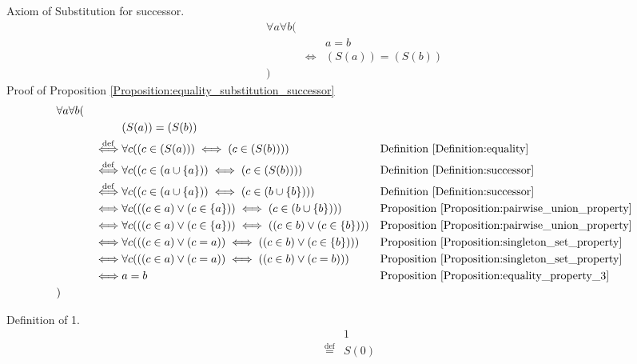 \begin{prop}
\label{Proposition:equality_substitution_successor}
Axiom of Substitution for successor.
\begin{align*}
& \forall a \forall b ( \\
& & & a = b \\
& & \iff & (S(a)) = (S(b)) \\
& )
\end{align*}
Proof of Proposition \ref{Proposition:equality_substitution_successor}
\begin{align*}
& \forall a \forall b ( \\
& & & (S(a)) = (S(b)) \\
& & \overset{\operatorname{def}}{\iff} & \forall c ((c \in (S(a))) \iff (c \in (S(b))))
& & \text{Definition \ref{Definition:equality}} \\
& & \overset{\operatorname{def}}{\iff} & \forall c ((c \in (a \cup \{ a \})) \iff (c \in (S(b))))
& & \text{Definition \ref{Definition:successor}} \\
& & \overset{\operatorname{def}}{\iff} & \forall c ((c \in (a \cup \{ a \})) \iff (c \in (b \cup \{ b \})))
& & \text{Definition \ref{Definition:successor}} \\
& & \iff & \forall c (((c \in a) \lor (c \in \{ a \})) \iff (c \in (b \cup \{ b \})))
& & \text{Proposition \ref{Proposition:pairwise_union_property}} \\
& & \iff & \forall c (((c \in a) \lor (c \in \{ a \})) \iff ((c \in b) \lor (c \in \{ b \})))
& & \text{Proposition \ref{Proposition:pairwise_union_property}} \\
& & \iff & \forall c (((c \in a) \lor (c = a)) \iff ((c \in b) \lor (c \in \{ b \})))
& & \text{Proposition \ref{Proposition:singleton_set_property}} \\
& & \iff & \forall c (((c \in a) \lor (c = a)) \iff ((c \in b) \lor (c = b)))
& & \text{Proposition \ref{Proposition:singleton_set_property}} \\
& & \iff & a = b
& & \text{Proposition \ref{Proposition:equality_property_3}} \\
& )
\end{align*}
\end{prop}

\begin{defn}
\label{Definition:one}
Definition of 1.
\begin{align*}
& 1 \\
\overset{\operatorname{def}}{=} & S(0)
\end{align*}
\end{defn}

